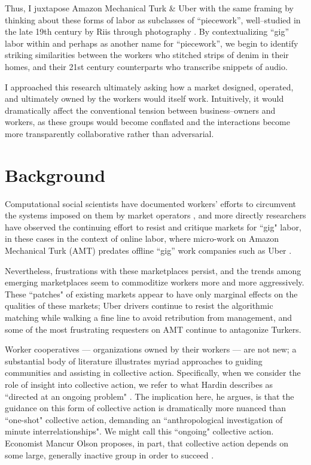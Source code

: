 \documentclass{sigchi-ext}
\begin{document}
Thus, I juxtapose Amazon Mechanical Turk \& Uber with the same framing by
thinking about these forms of labor as subclasses of ``piecework'',
well--studied in the late 19th century by Riis through photography
\cite{riisOtherSideLives}.
By contextualizing ``gig'' labor within and perhaps as another name for ``piecework'',
we begin to identify striking similarities between
the workers who stitched strips of denim in their homes, and
their 21st century counterparts who transcribe snippets of audio.

I approached this research ultimately asking how a market
designed, operated, and ultimately owned
by the workers would itself work.
Intuitively, it would dramatically affect the conventional tension between business--owners and workers,
as these groups would become conflated and the interactions become more transparently collaborative rather than adversarial.

\section{Background}
Computational social scientists have documented workers' efforts to circumvent the systems imposed on them by market operators
\cite{uberAlgorithm},
and more directly researchers have observed the continuing effort to resist and critique markets for ``gig" labor, in these cases in the context of online labor, where micro-work on Amazon Mechanical Turk (AMT) predates offline ``gig'' work companies such as Uber
\cite{turkopticon,dynamo}.

Nevertheless, frustrations with these marketplaces persist,
and the trends among emerging marketplaces seem to commoditize workers more and more aggressively.
These ``patches" of existing markets appear to have only marginal effects on the qualities of these markets;
Uber drivers continue to resist the algorithmic matching while walking a fine line to avoid retribution from management, and some of the most frustrating requesters on AMT continue to antagonize Turkers.


Worker cooperatives
--- organizations owned by their workers ---
are not new;
a substantial body of literature illustrates myriad approaches to guiding communities and assisting in collective action.
Specifically, when we consider the role of insight into collective action, we refer to what Hardin describes as ``directed at an ongoing problem"
\cite{russell1982collective}.
The implication here, he argues, is that the guidance on this form of collective action is dramatically more nuanced than ``one-shot" collective action, demanding an ``anthropological investigation of minute interrelationships".
We might call this ``ongoing" collective action.
Economist Mancur Olson proposes, in part, that collective action depends on some large, generally inactive group in order to succeed
\cite{olsonlogic}.
\end{document}
